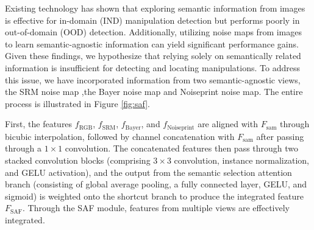 Existing technology has shown that exploring semantic information from images is effective for in-domain (IND) manipulation detection but performs poorly in out-of-domain (OOD) detection. Additionally, utilizing noise maps from images to learn semantic-agnostic information can yield significant performance gains. Given these findings, we hypothesize that relying solely on semantically related information is insufficient for detecting and locating manipulations. To address this issue, we have incorporated information from two semantic-agnostic views, the SRM noise map ,the Bayer noise map and Noiseprint noise map. The entire process is illustrated in Figure \ref{fig:saf}.

First, the features $f_{\text{RGB}}$, $f_{\text{SRM}}$, $f_{\text{Bayer}}$, and $f_{\text{Noiseprint}}$ are aligned with $F_{\text{sam}}$ through bicubic interpolation, followed by channel concatenation with $F_{\text{sam}}$ after passing through a $1 \times 1$ convolution. The concatenated features then pass through two stacked convolution blocks (comprising $3 \times 3$ convolution, instance normalization, and GELU activation), and the output from the semantic selection attention branch (consisting of global average pooling, a fully connected layer, GELU, and sigmoid) is weighted onto the shortcut branch to produce the integrated feature $F_{\text{SAF}}$. Through the SAF module, features from multiple views are effectively integrated.

